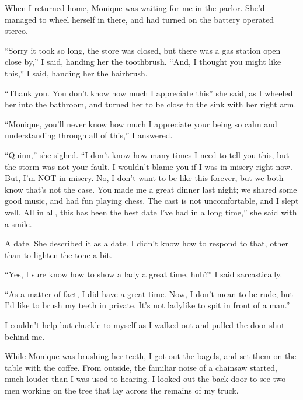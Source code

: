 When I returned home, Monique was waiting for me in the parlor. She'd managed to wheel
herself in there, and had turned on the battery operated stereo.

``Sorry it took so long, the store was closed, but there was a gas station open close
by,'' I said, handing her the toothbrush. ``And, I thought you might like this,'' I said,
handing her the hairbrush.

``Thank you. You don't know how much I appreciate this'' she said, as I wheeled her into
the bathroom, and turned her to be close to the sink with her right arm.

``Monique, you'll never know how much I appreciate your being so calm and understanding
through all of this,'' I answered.

``Quinn,'' she sighed. ``I don't know how many times I need to tell you this, but the
storm was not your fault. I wouldn't blame you if I was in misery right now. But, I'm NOT in
misery. No, I don't want to be like this forever, but we both know that's not the case. You made
me a great dinner last night; we shared some good music, and had fun playing chess. The cast is
not uncomfortable, and I slept well. All in all, this has been the best date I've had in a long
time,'' she said with a smile.

A date. She described it as a date. I didn't know how to respond to that, other than to
lighten the tone a bit.

``Yes, I sure know how to show a lady a great time, huh?'' I said sarcastically.

``As a matter of fact, I did have a great time. Now, I don't mean to be rude, but I'd like
to brush my teeth in private. It's not ladylike to spit in front of a man.''

I couldn't help but chuckle to myself as I walked out and pulled the door shut behind me.

While Monique was brushing her teeth, I got out the bagels, and set them on the table with
the coffee. From outside, the familiar noise of a chainsaw started, much louder than I was used
to hearing. I looked out the back door to see two men working on the tree that lay across the
remains of my truck.

